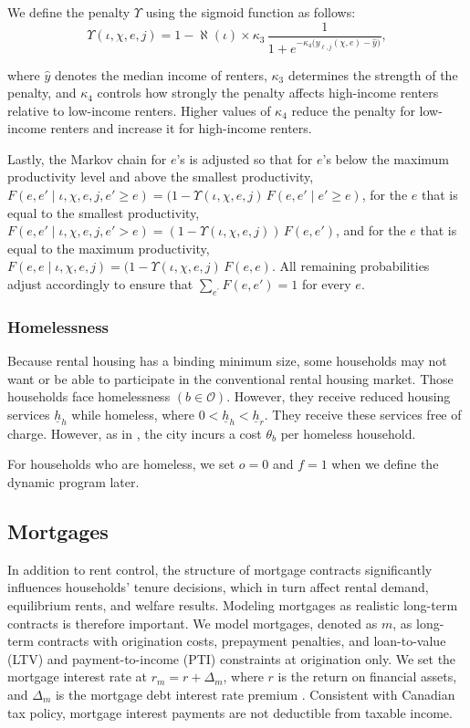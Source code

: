 \documentclass[parskip=full]{article}
\begin{document}
We define the penalty $\Upsilon$ using the sigmoid function as follows:
\begin{equation}\label{eq:penalty}
\Upsilon(\iota,\chi,e,j)=1-\aleph(\iota) \times  \kappa_3\,\frac{1}{1+e^{-\kappa_4\big( y_{\ell,j}(\chi,e)-\hat{y}\big)}},
\end{equation}

\noindent where $\hat{y}$ denotes the median income of renters, $\kappa_3$ determines the strength of the penalty, and $\kappa_4$ controls how strongly the penalty affects high-income renters relative to low-income renters. Higher values of $\kappa_4$ reduce the penalty for low-income renters and increase it for high-income renters.

Lastly, the Markov chain for $e$'s is adjusted so that for $e$'s below the maximum productivity level and above the smallest productivity, $F(e,e'\mid\iota,\chi,e,j,e'\geq e)=(1-\Upsilon(\iota,\chi,e,j)\,F(e,e'\mid e'\geq e)$, for the $e$ that is equal to the smallest productivity, $F(e,e'\mid\iota,\chi,e,j,e'>e)=(1-\Upsilon(\iota,\chi,e,j))\,F(e,e')$, and for the $e$ that is equal to the maximum productivity, $F(e,e\mid\iota,\chi,e,j)=(1-\Upsilon(\iota,\chi,e,j)\,F(e,e)$. All remaining probabilities adjust accordingly to ensure that $\sum_{e^{'}} F(e,e')=1$ for every $e$.

\subsubsection{Homelessness}\label{sec:cohabit_homeless}

Because rental housing has a binding minimum size, some households may not want or be able to participate in the conventional rental housing market. Those households face homelessness $\left(b \in \mathcal{O}\right)$. However, they receive reduced housing services $\underline{h}_{h}$ while homeless, where $0<\underline{h}_{h}<\underline{h}_{r}$. They receive these services free of charge. However, as in \citet{abramson-2024}, the city incurs a cost $\theta_{b}$ per homeless household. 

For households who are homeless, we set $o=0$ and $f=1$ when we define the dynamic program later.

\subsection{Mortgages}\label{subsection:morgtages}

In addition to rent control, the structure of mortgage contracts significantly influences households' tenure decisions, which in turn affect rental demand, equilibrium rents, and welfare results. Modeling mortgages as realistic long-term contracts is therefore important. We model mortgages, denoted as $m$, as long-term contracts with origination costs, prepayment penalties, and loan-to-value (LTV) and payment-to-income (PTI) constraints at origination only. We set the mortgage interest rate at $r_{m}=r+\Delta_m$, where $r$ is the return on financial assets, and $\Delta_m$ is the mortgage debt interest rate premium \citep{sommeretal-2013,sommersullivan-2017,kaplanetal-2019}. Consistent with Canadian tax policy, mortgage interest payments are not deductible from taxable income.
\end{document}
